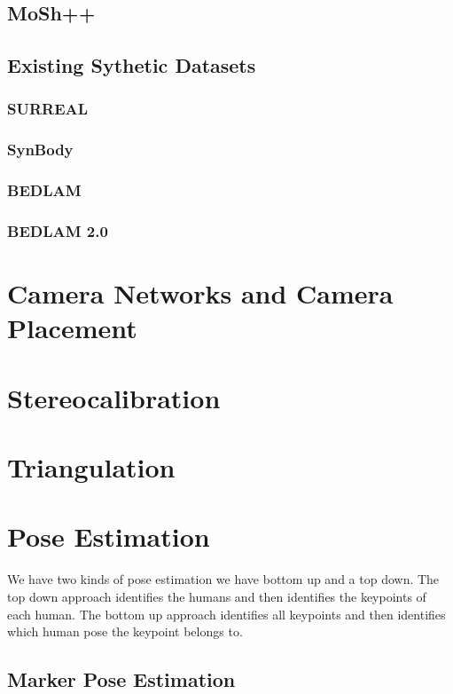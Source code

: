 \subsection{MoSh{++}}


\subsection{Existing Sythetic Datasets}
\subsubsection{SURREAL}
\subsubsection{SynBody}
\subsubsection{BEDLAM}
\subsubsection{BEDLAM 2.0}


\section{Camera Networks and Camera Placement}

\section{Stereocalibration}

\section{Triangulation}

\section{Pose Estimation}

We have two kinds of pose estimation we have bottom up and a top down.
The top down approach identifies the humans and then identifies the keypoints of each human.
The bottom up approach identifies all keypoints and then identifies which human pose the keypoint belongs to.

\subsection{Marker Pose Estimation}
